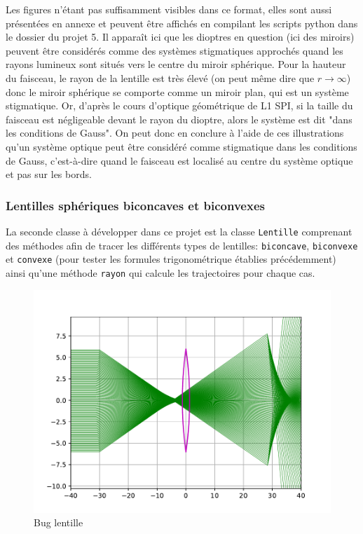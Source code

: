 \documentclass[a4paper, 11pt]{article}
\begin{document}
Les figures n'étant pas suffisamment visibles dans ce format, elles sont aussi présentées en annexe et peuvent être affichés en compilant les scripts python dans le dossier du projet 5. Il apparaît ici que les dioptres en question (ici des miroirs) peuvent être considérés comme des systèmes stigmatiques approchés quand les rayons lumineux sont situés vers le centre du miroir sphérique. Pour la hauteur du faisceau, le rayon de la lentille est très élevé (on peut même dire que $r \longrightarrow \infty$) donc le miroir sphérique se comporte comme un miroir plan, qui est un système stigmatique. Or, d'après le cours d'optique géométrique de L1 SPI, si la taille du faisceau est négligeable devant le rayon du dioptre, alors le système est dit "dans les conditions de Gauss". On peut donc en conclure à l'aide de ces illustrations qu'un système optique peut être considéré comme stigmatique dans les conditions de Gauss, c'est-à-dire quand le faisceau est localisé au centre du système optique et pas sur les bords.


\subsubsection{Lentilles sphériques biconcaves et biconvexes}
La seconde classe à développer dans ce projet est la classe \verb|Lentille| comprenant des méthodes afin de tracer les différents types de lentilles: \verb|biconcave|, \verb|biconvexe| et \verb|convexe| (pour tester les formules trigonométrique établies précédemment) ainsi qu'une méthode \verb|rayon| qui calcule les trajectoires pour chaque cas.

\begin{figure}[H]
	\centering
	\includegraphics[scale=0.6]{Figures/bug_lentille.pdf}
	\caption{Bug lentille}
	\label{fig:bug_lentille}
\end{figure}
\end{document}
